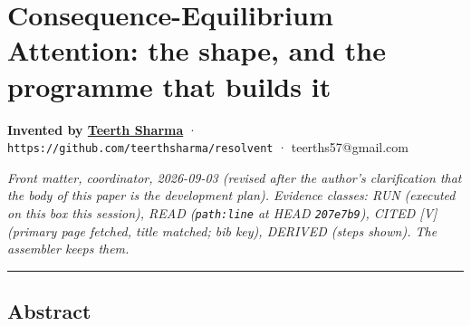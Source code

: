 \documentclass[11pt,a4paper]{article}
\theoremstyle{plain}
\theoremstyle{definition}
\theoremstyle{remark}
\begin{document}
\tableofcontents
\newpage
\section{Consequence-Equilibrium Attention: the shape, and the programme
that builds
it}\label{consequence-equilibrium-attention-the-shape-and-the-programme-that-builds-it}

\textbf{Invented by \href{https://teerthsharma.vercel.app/}{Teerth
Sharma}} · \texttt{https://github.com/teerthsharma/resolvent} ·
teerths57@gmail.com

\emph{Front matter, coordinator, 2026-09-03 (revised after the author's
clarification that the body of this paper is the development plan).
Evidence classes: RUN (executed on this box this session), READ
(\texttt{path:line} at HEAD \texttt{207e7b9}), CITED {[}V{]} (primary
page fetched, title matched; bib key), DERIVED (steps shown). The
assembler keeps them.}

\begin{center}\rule{0.5\linewidth}{0.5pt}\end{center}

\subsection{Abstract}\label{abstract}
\end{document}
